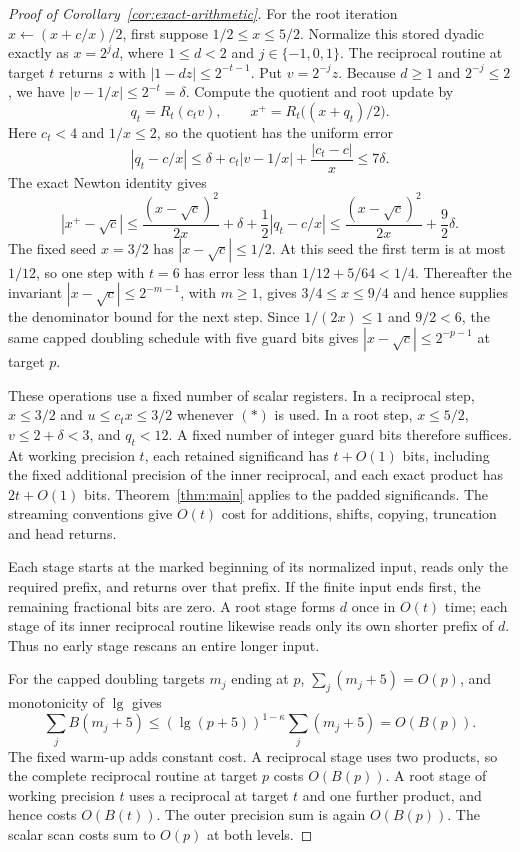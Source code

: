 \documentclass[11pt]{article}
\theoremstyle{definition}
\begin{document}
\begin{proof}[Proof of Corollary~\ref{cor:exact-arithmetic}]
For the root iteration $x\leftarrow(x+c/x)/2$, first suppose
$1/2\le x\le5/2$. Normalize this stored dyadic exactly as $x=2^j d$,
where $1\le d<2$ and $j\in\{-1,0,1\}$. The reciprocal routine at
target $t$ returns $z$ with $|1-dz|\le2^{-t-1}$. Put $v=2^{-j}z$.
Because $d\ge1$ and $2^{-j}\le2$, we have
$|v-1/x|\le2^{-t}=\delta$. Compute the quotient and root update by
\[
 q_t=R_t(c_t v),\qquad x^+=R_t\bigl((x+q_t)/2\bigr).
\]
Here $c_t<4$ and $1/x\le2$, so the quotient has the uniform error
\[
 |q_t-c/x|
 \le\delta+c_t|v-1/x|+\frac{|c_t-c|}{x}
 \le7\delta.
\]
The exact Newton identity gives
\[
 |x^+-\sqrt c|
 \le\frac{(x-\sqrt c)^2}{2x}+\delta+\frac12|q_t-c/x|
 \le\frac{(x-\sqrt c)^2}{2x}+\frac92\delta.
\]
The fixed seed $x=3/2$ has $|x-\sqrt c|\le1/2$. At this seed the
first term is at most $1/12$, so one step with $t=6$ has error less
than $1/12+5/64<1/4$. Thereafter the invariant
$|x-\sqrt c|\le2^{-m-1}$, with $m\ge1$, gives
$3/4\le x\le9/4$ and hence supplies the denominator bound for the
next step. Since $1/(2x)\le1$ and $9/2<6$, the same capped doubling
schedule with five guard bits gives $|x-\sqrt c|\le2^{-p-1}$ at
target $p$.

These operations use a fixed number of scalar registers. In a reciprocal
step, $x\le3/2$ and $u\le c_t x\le3/2$ whenever $(*)$ is used. In a
root step, $x\le5/2$, $v\le2+\delta<3$, and $q_t<12$. A fixed number
of integer guard bits therefore suffices. At working precision $t$,
each retained significand has $t+O(1)$ bits, including the fixed
additional precision of the inner reciprocal, and each exact product
has $2t+O(1)$ bits. Theorem~\ref{thm:main} applies to the padded
significands. The streaming conventions give $O(t)$ cost for additions,
shifts, copying, truncation and head returns.

Each stage starts at the marked beginning of its normalized input, reads
only the required prefix, and returns over that prefix. If the finite
input ends first, the remaining fractional bits are zero. A root stage
forms $d$ once in $O(t)$ time; each stage of its inner reciprocal routine
likewise reads only its own shorter prefix of $d$. Thus no early stage
rescans an entire longer input.

For the capped doubling targets $m_j$ ending at $p$,
$\sum_j(m_j+5)=O(p)$, and monotonicity of $\lg$ gives
\[
 \sum_j B(m_j+5)
 \le(\lg(p+5))^{1-\kappa}\sum_j(m_j+5)
 =O(B(p)).
\]
The fixed warm-up adds constant cost. A reciprocal stage uses two
products, so the complete reciprocal routine at target $p$ costs
$O(B(p))$. A root stage of working precision $t$ uses a reciprocal
at target $t$ and one further product, and hence costs $O(B(t))$.
The outer precision sum is again $O(B(p))$. The scalar scan costs
sum to $O(p)$ at both levels.


\end{proof}
\end{document}
